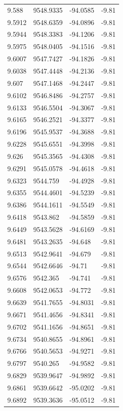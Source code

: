 \begin{table}[H]
\begin{tabular}{llll}
9.588 & 9548.9335 & -94.0585 & -9.81 \\
9.5912 & 9548.6359 & -94.0896 & -9.81 \\
9.5944 & 9548.3383 & -94.1206 & -9.81 \\
9.5975 & 9548.0405 & -94.1516 & -9.81 \\
9.6007 & 9547.7427 & -94.1826 & -9.81 \\
9.6038 & 9547.4448 & -94.2136 & -9.81 \\
9.607 & 9547.1468 & -94.2447 & -9.81 \\
9.6102 & 9546.8486 & -94.2757 & -9.81 \\
9.6133 & 9546.5504 & -94.3067 & -9.81 \\
9.6165 & 9546.2521 & -94.3377 & -9.81 \\
9.6196 & 9545.9537 & -94.3688 & -9.81 \\
9.6228 & 9545.6551 & -94.3998 & -9.81 \\
9.626 & 9545.3565 & -94.4308 & -9.81 \\
9.6291 & 9545.0578 & -94.4618 & -9.81 \\
9.6323 & 9544.759 & -94.4928 & -9.81 \\
9.6355 & 9544.4601 & -94.5239 & -9.81 \\
9.6386 & 9544.1611 & -94.5549 & -9.81 \\
9.6418 & 9543.862 & -94.5859 & -9.81 \\
9.6449 & 9543.5628 & -94.6169 & -9.81 \\
9.6481 & 9543.2635 & -94.648 & -9.81 \\
9.6513 & 9542.9641 & -94.679 & -9.81 \\
9.6544 & 9542.6646 & -94.71 & -9.81 \\
9.6576 & 9542.365 & -94.741 & -9.81 \\
9.6608 & 9542.0653 & -94.772 & -9.81 \\
9.6639 & 9541.7655 & -94.8031 & -9.81 \\
9.6671 & 9541.4656 & -94.8341 & -9.81 \\
9.6702 & 9541.1656 & -94.8651 & -9.81 \\
9.6734 & 9540.8655 & -94.8961 & -9.81 \\
9.6766 & 9540.5653 & -94.9271 & -9.81 \\
9.6797 & 9540.265 & -94.9582 & -9.81 \\
9.6829 & 9539.9647 & -94.9892 & -9.81 \\
9.6861 & 9539.6642 & -95.0202 & -9.81 \\
9.6892 & 9539.3636 & -95.0512 & -9.81 \\

\end{tabular}
\end{table}
